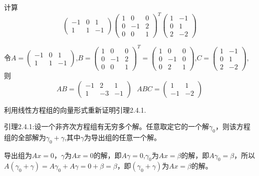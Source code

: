 \documentclass[a4paper]{report}
\begin{document}
\EX 计算
\begin{equation*}
\begin{pmatrix}
-1&0&1\\ 1&1&-1
\end{pmatrix}\begin{pmatrix}
1&0&0\\ 0&-1&2\\ 0&0&1
\end{pmatrix}^{T}\begin{pmatrix}
1&-1\\ 0&1\\ 2&-2
\end{pmatrix}
\end{equation*}

\begin{jie}
令$A=\begin{pmatrix}
-1&0&1\\ 1&1&-1
\end{pmatrix}$,$B=\begin{pmatrix}
1&0&0\\ 0&-1&2\\ 0&0&1
\end{pmatrix}^{T}=\begin{pmatrix}
1&0&0\\ 0&-1&0\\ 0&2&1
\end{pmatrix}$,$C=\begin{pmatrix}
1&-1\\ 0&1\\ 2&-2
\end{pmatrix}$,则
\begin{equation*}
  AB=\begin{pmatrix}
-1&2&1\\ 1&-3&-1
\end{pmatrix}~~~
ABC=\begin{pmatrix}
1&1\\ -1&-2
\end{pmatrix}
\end{equation*}
\end{jie}

\EX 利用线性方程组的向量形式重新证明引理2.4.1.

引理2.4.1:设一个非齐次方程组有无穷多个解。任意取定它的一个解$\gamma_0$，则该方程组的全部解为$\gamma_0+\gamma$,其中$\gamma$为导出组的任意一个解。

\begin{zhengming}
导出组为$Ax=0$，$\gamma$为$Ax=0$的解，即$A\gamma=0$,$\gamma_0$为$Ax=\beta$的解，即$A\gamma_0=\beta$，所以$A(\gamma_0+\gamma)=A\gamma_0+A\gamma=0+\beta=\beta$，即$(\gamma_0+\gamma)$为$Ax=\beta$的解。
\end{zhengming}
\end{document}
